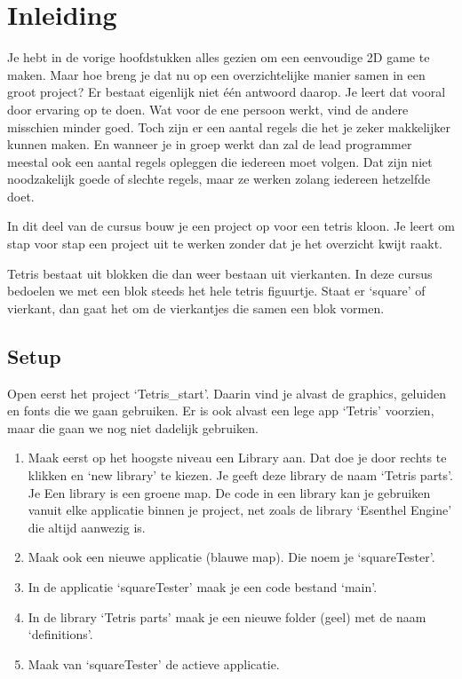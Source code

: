 \chapter{Inleiding}
Je hebt in de vorige hoofdstukken alles gezien om een eenvoudige 2D game te maken. Maar hoe breng je dat nu op een overzichtelijke manier samen in een groot project? Er bestaat eigenlijk niet \'e\'en antwoord daarop. Je leert dat vooral door ervaring op te doen. Wat voor de ene persoon werkt, vind de andere misschien minder goed. Toch zijn er een aantal regels die het je zeker makkelijker kunnen maken. En wanneer je in groep werkt dan zal de lead programmer meestal ook een aantal regels opleggen die iedereen moet volgen. Dat zijn niet noodzakelijk goede of slechte regels, maar ze werken zolang iedereen hetzelfde doet.

In dit deel van de cursus bouw je een project op voor een tetris kloon. Je leert om stap voor stap een project uit te werken zonder dat je het overzicht kwijt raakt.

\begin{note}
Tetris bestaat uit blokken die dan weer bestaan uit vierkanten. In deze cursus bedoelen we met een blok steeds het hele tetris figuurtje. Staat er `square' of vierkant, dan gaat het om de vierkantjes die samen een blok vormen.
\end{note}

\section{Setup}
Open eerst het project `Tetris\_start'. Daarin vind je alvast de graphics, geluiden en fonts die we gaan gebruiken. Er is ook alvast een lege app `Tetris' voorzien, maar die gaan we nog niet dadelijk gebruiken.

\begin{enumerate}
	\item Maak eerst op het hoogste niveau een Library aan. Dat doe je door rechts te klikken en `new library' te kiezen. Je geeft deze library de naam `Tetris parts'. Je Een library is een groene map. De code in een library kan je gebruiken vanuit elke applicatie binnen je project, net zoals de library `Esenthel Engine' die altijd aanwezig is.
	\item Maak ook een nieuwe applicatie (blauwe map). Die noem je `squareTester'.
	\item In de applicatie `squareTester' maak je een code bestand `main'. 
	\item In de library `Tetris parts' maak je een nieuwe folder (geel) met de naam `definitions'.
	\item Maak van `squareTester' de actieve applicatie.
\end{enumerate}
	
